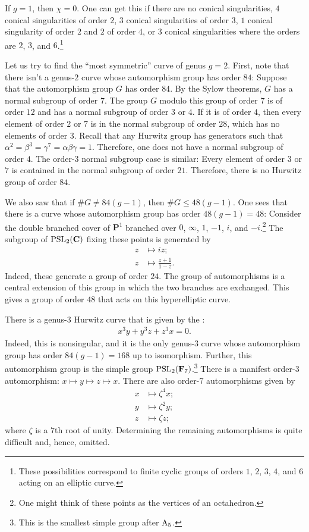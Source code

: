 \documentclass [11 pt, oneside] {article}
\begin{document}
If $g=1$, then $\chi=0$. One can get this if there are no conical singularities, $4$ conical singularities of order $2$, $3$ conical singularities of order $3$, $1$ conical singularity of order $2$ and $2$ of order $4$, or $3$ conical singularities where the orders are $2$, $3$, and $6$.\footnote{These possibilities correspond to finite cyclic groups of orders $1$, $2$, $3$, $4$, and $6$ acting on an elliptic curve.} 

		Let us try to find the ``most symmetric'' curve of genus $g=2$. First, note that there isn't a genus-$2$ curve whose automorphism group has order $84$: Suppose that the automorphism group $G$ has order $84$. By the Sylow theorems, $G$ has a normal subgroup of order $7$. The group $G$ modulo this group of order $7$ is of order $12$ and has a normal subgroup of order $3$ or $4$. If it is of order $4$, then every element of order $2$ or $7$ is in the normal subgroup of order $28$, which has no elements of order $3$. Recall that any Hurwitz group has generators such that $\alpha^2 = \beta^3 = \gamma^7 = \alpha\beta\gamma = 1$. Therefore, one does not have a normal subgroup of order $4$. The order-$3$ normal subgroup case is similar: Every element of order $3$ or $7$ is contained in the normal subgroup of order $21$. Therefore, there is no Hurwitz group of order $84$.

		We also saw that if $\# G\ne 84(g-1)$, then $\# G \le 48(g-1)$. One sees that there is a curve whose automorphism group has order $48(g-1)=48$: Consider the double branched cover of $\mathbf{P}^1$ branched over $0$, $\infty$, $1$, $-1$, $i$, and $-i$.\footnote{One might think of these points as the vertices of an octahedron.} The subgroup of $\operatorname{PSL}_2(\mathbf{C})$ fixing these points is generated by
		\begin{align*}
			z&\longmapsto iz;\\
			z&\longmapsto \frac{z+1}{1-z}.
		\end{align*}
		Indeed, these generate a group of order $24$. The group of automorphisms is a central extension of this group in which the two branches are exchanged. This gives a group of order $48$ that acts on this hyperelliptic curve.

		There is a genus-$3$ Hurwitz curve that is given by the :
		\begin{align*}
			x^3y + y^3z + z^3x=0.
		\end{align*}
		Indeed, this is nonsingular, and it is the only genus-$3$ curve whose automorphism group has order $84(g-1)=168$ up to isomorphism. Further, this automorphism group is the simple group $\operatorname{PSL}_{2}(\mathbf{F}_{7})$.\footnote{This is the smallest simple group after $\operatorname{A}_5$.} There is a manifest order-$3$ automorphism: $x\longmapsto y\longmapsto z\longmapsto x$. There are also order-$7$ automorphisms given by
		\begin{align*}
			x&\longmapsto \zeta^4x;\\
			y&\longmapsto \zeta^2y;\\
			z&\longmapsto \zeta z;
		\end{align*}
		where $\zeta$ is a $7$th root of unity. Determining the remaining automorphisms is quite difficult and, hence, omitted.
\end{document}
